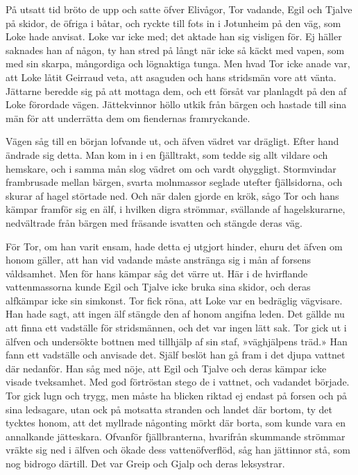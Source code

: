 På utsatt tid bröto de upp och satte öfver Elivågor, Tor vadande, Egil
och Tjalve på skidor, de öfriga i båtar, och ryckte till fots in i
Jotunheim på den väg, som Loke hade anvisat. Loke var icke med; det
aktade han sig visligen för. Ej häller saknades han af någon, ty han
stred på långt när icke så käckt med vapen, som med sin skarpa,
mångordiga och lögnaktiga tunga. Men hvad Tor icke anade var, att Loke
låtit Geirraud veta, att asaguden och hans stridsmän vore att vänta.
Jättarne beredde sig på att mottaga dem, och ett försåt var planlagdt på
den af Loke förordade vägen. Jättekvinnor höllo utkik från bärgen och
hastade till sina män för att underrätta dem om fiendernas framryckande.

Vägen såg till en början lofvande ut, och äfven vädret var drägligt.
Efter hand ändrade sig detta. Man kom in i en fjälltrakt, som tedde sig
allt vildare och hemskare, och i samma mån slog vädret om och vardt
ohyggligt.
Stormvindar\protect\hypertarget{lb1625905.xhtmlux5cux23start53}{}{}\protect\hypertarget{lb1625905.xhtmlux5cux23start53-a}{}{}\protect\hypertarget{lb1625905.xhtmlux5cux23start53-b}{}{}\protect\hypertarget{lb1625905.xhtmlux5cux23start53-c}{}{}\protect\hypertarget{lb1625905.xhtmlux5cux23start53-d}{}{}
frambrusade mellan bärgen, svarta molnmassor seglade utefter
fjällsidorna, och skurar af hagel störtade ned. Och när dalen gjorde en
krök, sågo Tor och hans kämpar framför sig en älf, i hvilken digra
strömmar, svällande af hagelskurarne, nedvältrade från bärgen med
fräsande isvatten och stängde deras väg.

För Tor, om han varit ensam, hade detta ej utgjort hinder, ehuru det
äfven om honom gäller, att han vid vadande måste anstränga sig i mån af
forsens våldsamhet. Men för hans kämpar såg det värre ut. Här i de
hvirflande vattenmassorna kunde Egil och Tjalve icke bruka sina skidor,
och deras alfkämpar icke sin simkonst. Tor fick röna, att Loke var en
bedräglig vägvisare. Han hade sagt, att ingen älf stängde den af honom
angifna leden. Det gällde nu att finna ett vadställe för stridsmännen,
och det var ingen lätt sak. Tor gick ut i älfven och undersökte bottnen
med tillhjälp af sin staf, »väghjälpens träd.» Han fann ett vadställe
och anvisade det. Själf beslöt han gå fram i det djupa vattnet där
nedanför. Han såg med nöje, att Egil och Tjalve och deras kämpar icke
visade tveksamhet. Med god förtröstan stego de i vattnet, och vadandet
började. Tor gick lugn och trygg, men måste ha blicken riktad ej endast
på forsen och på sina ledsagare, utan ock på motsatta stranden och
landet där bortom, ty det tycktes honom, att det myllrade någonting
mörkt där borta, som kunde vara en annalkande jätteskara. Ofvanför
fjällbranterna, hvarifrån skummande strömmar vräkte sig ned i älfven och
ökade dess vattenöfverflöd, såg han jättinnor stå, som nog bidrogo
därtill. Det var Greip och Gjalp och deras leksystrar.

